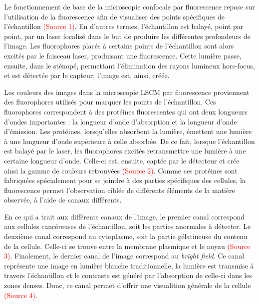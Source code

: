 \documentclass[11pt,letterpaper]{article}
\begin{document}
Le fonctionnement de base de la microscopie confocale par fluorescence repose sur l'utilisation de la fluorescence afin de visualiser des points spécifiques de l'échantillon \textcolor{red}{(Source 1)}. En d'autres termes, l'échantillon est balayé, point par point, par un laser focalisé dans le but de produire les différentes profondeurs de l'image. Les fluorophores placés à certains points de l'échantillon sont alors excités par le faisceau laser, produisant une fluorescence. Cette lumière passe, ensuite, dans le sténopé, permettant l'élimination des rayons lumineux hors-focus, et est détectée par le capteur; l'image est, ainsi, créée.

Les couleurs des images dans la microscopie LSCM par fluorescence proviennent des fluorophores utilisés pour marquer les points de l'échantillon. Ces fluorophores correspondent à des protéines fluorescentes qui ont deux longueurs d'ondes importantes : la longueur d'onde d'absorption et la longueur d'onde d'émission. Les protéines, lorsqu'elles absorbent la lumière, émettent une lumière à une longueur d'onde supérieure à celle absorbée. De ce fait, lorsque l'échantillon est balayé par le laser, les fluorophores excités retransmettre une lumière à une certaine longueur d'onde. Celle-ci est, ensuite, captée par le détecteur et crée ainsi la gamme de couleurs retrouvées \textcolor{red}{(Source 2)}. Comme ces protéines sont fabriquées spécialement pour se joindre à des parties spécifiques des cellules, la fluorescence permet l'observation ciblée de différents éléments de la matière observée, à l'aide de canaux différents.

En ce qui a trait aux différents canaux de l'image, le premier canal correspond aux cellules cancéreuses de l'échantillon, soit les parties anormales à détecter. Le deuxième canal correspond au cytoplasme, soit la partie gélatineuse du contenu de la cellule. Celle-ci se trouve entre la membrane plasmique et le noyau \textcolor{red}{(Source 3)}. Finalement, le dernier canal de l'image correspond au \textit{bright field}. Ce canal représente une image en lumière blanche traditionnelle, la lumière est transmise à travers l'échantillon et le contraste est généré par l'absorption de celle-ci dans les zones denses. Donc, ce canal permet d'offrir une visualition générale de la cellule \textcolor{red}{(Source 4)}.

\end{document}
